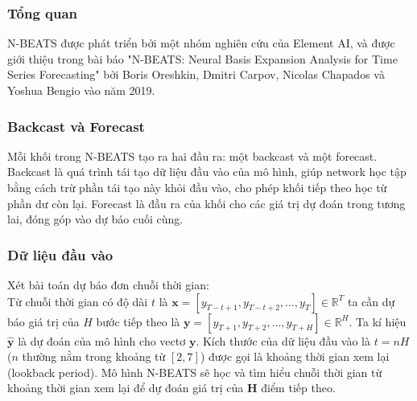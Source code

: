\documentclass[conference]{IEEEtran}
\begin{document}
\subsubsection{Tổng quan}
N-BEATS được phát triển bởi một nhóm nghiên cứu của Element AI, và được giới thiệu trong bài báo "N-BEATS: Neural Basis Expansion Analysis for Time Series Forecasting" bởi Boris Oreshkin, Dmitri Carpov, Nicolas Chapados và Yoshua Bengio vào năm 2019.
\vspace{3mm}
\subsubsection{Backcast và Forecast}
Mỗi khối trong N-BEATS tạo ra hai đầu ra: một backcast và một forecast. Backcast là quá trình tái tạo dữ liệu đầu vào của mô hình, giúp network học tập bằng cách trừ phần tái tạo này khỏi đầu vào, cho phép khối tiếp theo học từ phần dư còn lại. Forecast là đầu ra của khối cho các giá trị dự đoán trong tương lai, đóng góp vào dự báo cuối cùng.
\vspace{3mm}
\subsubsection{Dữ liệu đầu vào}
Xét bài toán dự báo đơn chuỗi thời gian:\\
Từ chuỗi thời gian có độ dài $t$ là $\mathbf{x} =
    [y_{T-t+1}, y_{T-t+2}, \ldots, y_{T}] \in \mathbb{R}^T$ ta cần dự báo giá trị của $H$ bước tiếp theo là $\mathbf{y} =
    [y_{T+1}, y_{T+2}, \ldots, y_{T+H}] \in \mathbb{R}^H$. Ta kí hiệu $\hat{\mathbf{y}}$
là dự đoán của mô hình cho vectơ $\mathbf{y}$. Kích thước của dữ liệu đầu vào là $t = nH$ ($n$
thường nằm trong khoảng từ $[2, 7]$) được gọi là khoảng thời gian xem lại (lookback period). Mô hình N-BEATS sẽ học và tìm hiểu chuỗi thời gian từ khoảng thời gian
xem lại để dự đoán giá trị của $\mathbf{H}$ điểm tiếp theo.
\vspace{3mm}
\end{document}
